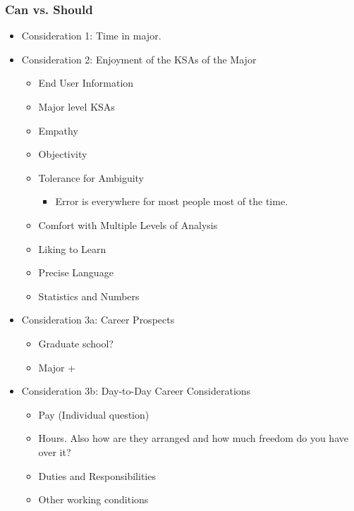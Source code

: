 \documentclass{report}
\begin{document}
\subsubsection{Can vs. Should}

\begin{itemize}
    \item Consideration 1: Time in major.
    \item Consideration 2: Enjoyment of the KSAs of the Major
    \begin{itemize}
        \item End User Information 
        \item Major level KSAs
        \item Empathy
        \item Objectivity
        \item Tolerance for Ambiguity 
        \begin{itemize}
            \item Error is everywhere for most people most of the time.
        \end{itemize}
        \item Comfort with Multiple Levels of Analysis
        \item Liking to Learn
        \item Precise Language
        \item Statistics and Numbers
    \end{itemize}
    \item Consideration 3a: Career Prospects
    \begin{itemize}
        \item Graduate school? 
        \item Major +
    \end{itemize}
    \item Consideration 3b: Day-to-Day Career Considerations
    \begin{itemize}
        \item Pay (Individual question)
        \item Hours. Also how are they arranged and how much freedom do you have over it? 
        \item Duties and Responsibilities
        \item Other working conditions
    \end{itemize}
\end{itemize}
\end{document}
